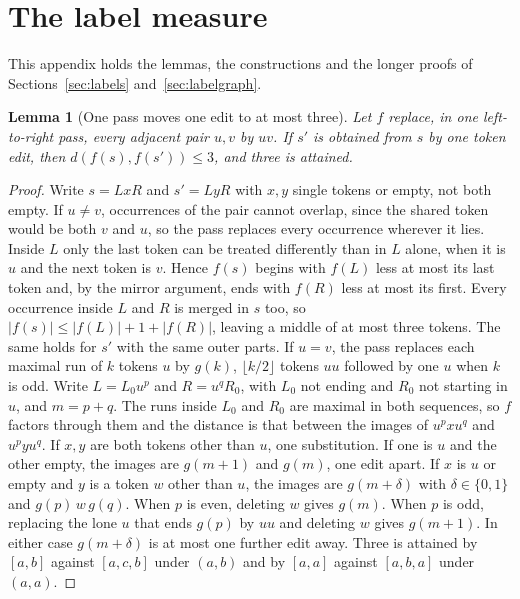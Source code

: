 \documentclass[11pt,a4paper]{article}
\theoremstyle{definition}
\theoremstyle{plain}
\newtheorem{lemma}{Lemma}
\begin{document}
\section{The label measure}\label{app:labels}

This appendix holds the lemmas, the constructions and the longer proofs of Sections~\ref{sec:labels}
and~\ref{sec:labelgraph}.


\begin{lemma}[One pass moves one edit to at most three]\label{lem:E}
Let \(f\) replace, in one left-to-right pass, every adjacent pair \(u, v\) by \(uv\). If \(s'\) is obtained from \(s\)
by one token edit, then \(d(f(s), f(s')) \le 3\), and three is attained.
\end{lemma}

\begin{proof}
Write \(s = LxR\) and \(s' = LyR\) with \(x, y\) single tokens or empty, not both empty. If \(u \ne v\), occurrences of
the pair cannot overlap, since the shared token would be both \(v\) and \(u\), so the pass replaces every occurrence
wherever it lies. Inside \(L\) only the last token can be treated differently than in \(L\) alone, when it is \(u\) and
the next token is \(v\). Hence \(f(s)\) begins with \(f(L)\) less at most its last token and, by the mirror argument,
ends with \(f(R)\) less at most its first. Every occurrence inside \(L\) and \(R\) is merged in \(s\) too, so
\(|f(s)| \le |f(L)| + 1 + |f(R)|\), leaving a middle of at most three tokens. The same holds for \(s'\) with the same
outer parts. If \(u = v\), the pass replaces each maximal run of \(k\) tokens \(u\) by \(g(k)\), \(\lfloor k/2 \rfloor\)
tokens \(uu\) followed by one \(u\) when \(k\) is odd. Write \(L = L_0 u^p\) and \(R = u^q R_0\), with \(L_0\) not
ending and \(R_0\) not starting in \(u\), and \(m = p + q\). The runs inside \(L_0\) and \(R_0\) are maximal in both
sequences, so \(f\) factors through them and the distance is that between the images of \(u^p x u^q\) and \(u^p y u^q\).
If \(x, y\) are both tokens other than \(u\), one substitution. If one is \(u\) and the other empty, the images are
\(g(m+1)\) and \(g(m)\), one edit apart. If \(x\) is \(u\) or empty and \(y\) is a token \(w\) other than \(u\), the
images are \(g(m + \delta)\) with \(\delta \in \{0, 1\}\) and \(g(p)\,w\,g(q)\). When \(p\) is even, deleting \(w\)
gives \(g(m)\). When \(p\) is odd, replacing the lone \(u\) that ends \(g(p)\) by \(uu\) and deleting \(w\) gives
\(g(m+1)\). In either case \(g(m+\delta)\) is at most one further edit away. Three is attained by \([a, b]\) against
\([a, c, b]\) under \((a, b)\) and by \([a, a]\) against \([a, b, a]\) under \((a, a)\).
\end{proof}
\end{document}
